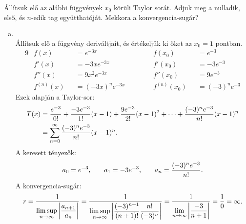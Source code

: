\begin{exercise}{%
    Állítsuk elő az alábbi függvények $x_0$ körüli Taylor sorát.
    Adjuk meg a nulladik, első, és $n$-edik tag együtthatóját. Mekkora a
    konvergencia-sugár?
  }
{\begin{enumerate}[a)]
      \item {}\\[2mm]
            Állítsuk elő a függvény deriváltjait, és értékeljük ki őket az
            $x_0 = 1$ pontban.
            \begin{alignat*}{9}
               & f(x)       &  & = e^{-3x}                 &  & f(x_0)       &  & = e^{-3}        \\
               & f'(x)      &  & = -3xe^{-3x} \hspace{2cm} &  & f'(x_0)      &  & = -3 e^{-3}     \\
               & f''(x)     &  & = 9x^2e^{-3x}             &  & f''(x_0)     &  & = 9 e^{-3}      \\
               & f^{(n)}(x) &  & = (-3x)^n e^{-3x}         &  & f^{(n)}(x_0) &  & = (-3)^n e^{-3}
            \end{alignat*}
            Ezek alapján a Taylor-sor:
            \begin{align*}
              T(x)
               & = \frac{e^{-3}}{0!}
              + \frac{-3e^{-3}}{1!}(x - 1)
              + \frac{9e^{-3}}{2!}(x - 1)^2
              + \dots
              + \frac{(-3)^n e^{-3}}{n!} (x - 1)^n
              \\
               & = \sum_{n = 0}^\infty
              \frac{(-3)^n e^{-3}}{n!}(x - 1)^n
              \text.
            \end{align*}
            A keresett tényezők:
            \[
              a_0 = e^{-3}
              \text, \qquad
              a_1 = -3 e^{-3}
              \text, \qquad
              a_n = \frac{(-3)^n e^{-3}}{n!}
              \text.
            \]
            A konvergencia-sugár:
            \[
              r
              = \frac{1}{\displaystyle\limsup_{n \rightarrow \infty} \left|
                \dfrac{a_{n+1}}{a_n}
                \right|
              }
              = \frac{1}{\displaystyle\limsup_{n \rightarrow \infty} \left|
                \dfrac{(-3)^{n+1} \vphantom{e^{-3}}}{(n+1)!}
                \dfrac{n!}{(-3)^n \vphantom{e^{-3}}}
                \right|}
              = \frac{1}{\displaystyle\lim_{n \rightarrow \infty} \left|
                \dfrac{-3}{n+1}
                \right|}
              = \frac{1}{0}
              = \infty
              \text.
            \]
    \end{enumerate}
  }
\end{exercise}
